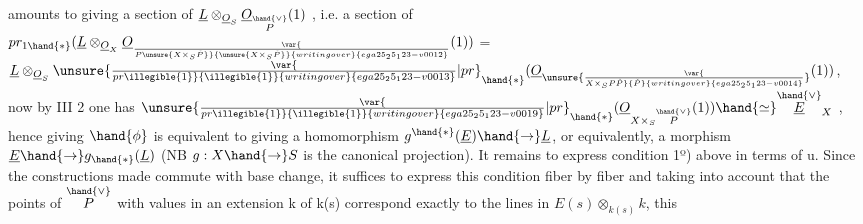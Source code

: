 amounts to giving a section of $\underline{L}\otimes_{\underline{O}_S}\underline{O}_{\overset{\hand{\vee}}{P}}(1)$ , i.e. a section
of $pr_{1\hand{*}}(\underline{L}\otimes_{\underline{O}_X}\underline{O}_{\var{\over{P}{\unsure{X\times_S\check{P}}}}{\unsure{X\times_S\check{P}}}{writing over}{ega25_25_123-v0012}}(1))$ = $\underline{L}\otimes_{\underline{O}_S}\unsure{\var{\over{pr}{\illegible{1}}}{\illegible{1}}{writing over}{ega25_25_123-v0013}|pr}_{\hand{*}}(\underline{O}_{\unsure{\var{\over{X\times_S P}{\check{P}}}{\check{P}}{writing over}{ega25_25_123-v0014}}}(1))$, 
 now by III 2 one has $\unsure{\var{\over{pr}{\illegible{1}}}{\illegible{1}}{writing over}{ega25_25_123-v0019}|pr}_{\hand{*}}(\underline{O}_{X\times_S\overset{\hand{\vee}}{P}}(1))\hand{\simeq}\overset{\hand{\vee}}{\underline{E}}_X$ , hence
giving $\hand{\phi}$ is equivalent to  giving a homomorphism $g^{\hand{*}}(\underline{E})\hand{\to}\underline{L}$,
or equivalently, a morphism  $\underline{E}\hand{\to} g_{\hand{*}}(\underline{L})$ (NB $g:X\hand{\to} S$ is
the canonical projection). It remains to express condition 1º) above
in terms of u. Since the constructions made commute with
base change, it suffices to express this condition fiber by fiber\hand{,}
and taking into account that the points of $\overset{\hand{\vee}}{P}$ with values in an extension k of
k(s) correspond exactly to the lines in $E(s)\otimes_{k(s)}k$, this

